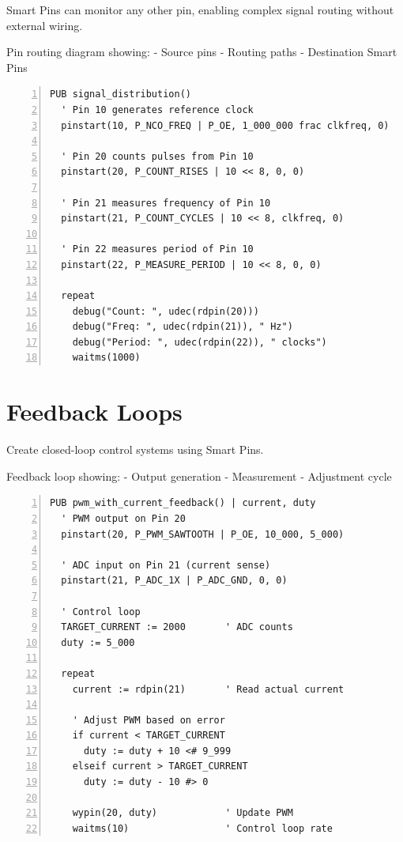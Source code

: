 \documentclass[11pt,a4paper,oneside,english]{book}
\begin{document}
Smart Pins can monitor any other pin, enabling complex signal routing
without external wiring.

Pin routing diagram showing: - Source pins - Routing paths - Destination
Smart Pins

\begin{Spin2Block}
\begin{Verbatim}[numbers=left,numbersep=5pt,xleftmargin=15pt]
PUB signal_distribution()
  ' Pin 10 generates reference clock
  pinstart(10, P_NCO_FREQ | P_OE, 1_000_000 frac clkfreq, 0)
  
  ' Pin 20 counts pulses from Pin 10
  pinstart(20, P_COUNT_RISES | 10 << 8, 0, 0)
  
  ' Pin 21 measures frequency of Pin 10
  pinstart(21, P_COUNT_CYCLES | 10 << 8, clkfreq, 0)
  
  ' Pin 22 measures period of Pin 10
  pinstart(22, P_MEASURE_PERIOD | 10 << 8, 0, 0)
  
  repeat
    debug("Count: ", udec(rdpin(20)))
    debug("Freq: ", udec(rdpin(21)), " Hz")
    debug("Period: ", udec(rdpin(22)), " clocks")
    waitms(1000)
\end{Verbatim}
\end{Spin2Block}

\hypertarget{feedback-loops}{%
\section{Feedback Loops}\label{feedback-loops}}

Create closed-loop control systems using Smart Pins.

Feedback loop showing: - Output generation - Measurement - Adjustment
cycle

\begin{Spin2Block}
\begin{Verbatim}[numbers=left,numbersep=5pt,xleftmargin=15pt]
PUB pwm_with_current_feedback() | current, duty
  ' PWM output on Pin 20
  pinstart(20, P_PWM_SAWTOOTH | P_OE, 10_000, 5_000)
  
  ' ADC input on Pin 21 (current sense)
  pinstart(21, P_ADC_1X | P_ADC_GND, 0, 0)
  
  ' Control loop
  TARGET_CURRENT := 2000       ' ADC counts
  duty := 5_000
  
  repeat
    current := rdpin(21)       ' Read actual current
    
    ' Adjust PWM based on error
    if current < TARGET_CURRENT
      duty := duty + 10 <# 9_999
    elseif current > TARGET_CURRENT
      duty := duty - 10 #> 0
      
    wypin(20, duty)            ' Update PWM
    waitms(10)                 ' Control loop rate
\end{Verbatim}
\end{Spin2Block}
\end{document}
